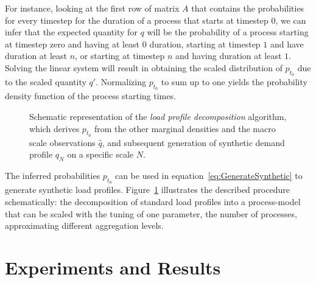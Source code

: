 \documentclass[conference]{IEEEtran}
\begin{document}
For instance, looking at the first row of matrix $A$ that contains the probabilities for every timestep for the duration of a process that starts at timestep $0$, we can infer that the expected quantity for $q$ will be the probability of a process starting at timestep zero and having at least $0$ duration, starting at timestep $1$ and have duration at least $n$, or starting at timestep $n$ and having duration at least $1$. Solving the linear system will result in obtaining the scaled distribution of $p_{t_0}$ due to the scaled quantity $q'$. Normalizing $p_{t_0}$ to sum up to one yields the probability density function of the process starting times.
\begin{figure}[t]
\centering
{}
\caption{Schematic representation of the \emph{load profile decomposition} algorithm, which derives $p_{t_0}$ from the other marginal densities and the macro scale observations $\hat q$, and subsequent generation of synthetic demand profile $q_N$ on a specific scale $N$.}\label{fig:system}
\end{figure}%

The inferred probabilities $p_{t_0}$ can be used in equation~\eqref{eq:GenerateSynthetic} to generate synthetic load profiles.  Figure~\ref{fig:system} illustrates the described procedure schematically: the decomposition of standard load profiles into a process-model that can be scaled with the tuning of one parameter, the number of processes, approximating different aggregation levels.  

\section{Experiments and Results}
\label{sec:Experiments}
\end{document}
